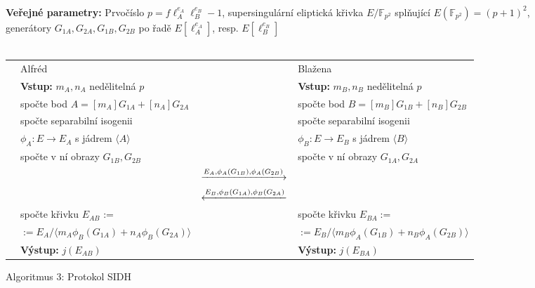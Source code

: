 \documentclass[12pt]{report}
\begin{document}
\begin{figure}[h]
\begin{center} 
\makebox[1cm]{\rule{17.3cm}{0.4pt}}\\
\hspace{-1.35cm} \textbf{Veřejné parametry:} Prvočíslo $p = f \ell_A ^{e_A} \ell_B ^{e_B} - 1$, supersingulární eliptická křivka $E/\mathbb{F}_{p^2}$ splňující $E(\mathbb{F}_{p^2}) = (p+1)^2$, generátory $G_{1A},G_{2A},G_{1B},G_{2B}$ po řadě $E[\ell_A ^{e_A}]$, resp. $E[\ell_B ^{e_B}]$\\

\vspace{-0.25cm}
\makebox[\linewidth]{\rule{17.3cm}{0.4pt}}\\
\vspace{0.2cm}
\hspace*{-1cm}\begin{tabular}{l l c l}
 \cline{2-2} \cline{4-4} 
& Alfréd & & Blažena \\ 
\cline{2-2} \cline{4-4} 
& \textbf{Vstup:} $m_A,n_A$ nedělitelná $p$ & & \textbf{Vstup:} $m_B,n_B$ nedělitelná $p$ \\
&spočte bod $A = [m_A]G_{1A}+[n_A]G_{2A}$ & & spočte bod $B = [m_B]G_{1B}+[n_B]G_{2B}$\\
&spočte separabilní isogenii& &spočte separabilní isogenii\\
&$\phi_A : E \longrightarrow E_A$ s jádrem $\langle A\rangle$ & &$\phi_B : E \longrightarrow E_B$ s jádrem $\langle B\rangle$\\
&spočte v ní obrazy $G_{1B},G_{2B}$& &spočte  v ní obrazy $G_{1A},G_{2A}$\\
 & & $\xlongrightarrow{E_A, \phi_A (G_{1B}), \phi_A (G_{2B})}$  &  \\
&  & $\xlongleftarrow{E_B, \phi_B (G_{1A}), \phi_B (G_{2A})} $ &  \\
& spočte křivku $E_{AB}$ := & & spočte křivku $E_{BA} :=$\\
& $:= E_A/\langle m_A \phi_B (G_{1A})+ n_A \phi_B (G_{2A}) \rangle$ &  & $ := E_B/\langle m_B \phi_A (G_{1B})+ n_B \phi_A (G_{2B}) \rangle$ \\
& \textbf{Výstup:} $j(E_{AB})$ & & \textbf{Výstup:} $j(E_{BA})$
\end{tabular}
\caption*{Algoritmus 3: Protokol SIDH}
\end{center}
\end{figure}
\end{document}
